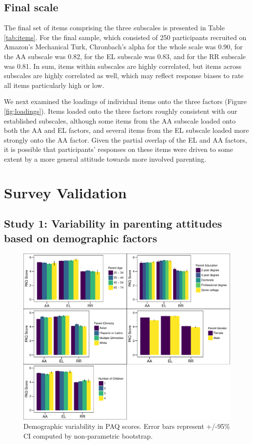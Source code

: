\documentclass[floatsintext,man]{apa6}
\theoremstyle{definition}
\theoremstyle{definition}
\theoremstyle{definition}
\theoremstyle{remark}
\begin{document}
\subsection{Final scale}\label{final-scale}

The final set of items comprising the three subscales is presented in
Table \ref{tab:items}. For the final sample, which consisted of 250
participants recruited on Amazon's Mechanical Turk, Chronbach's alpha
for the whole scale was 0.90, for the AA subscale was 0.82, for the EL
subscale was 0.83, and for the RR subscale was 0.81. In sum, items
within subscales are highly correlated, but items across subscales are
highly correlated as well, which may reflect response biases to rate all
items particularly high or low.

We next examined the loadings of individual items onto the three factors
(Figure \ref{fig:loadings}). Items loaded onto the three factors roughly
consistent with our established subscales, although some items from the
AA subscale loaded onto both the AA and EL factors, and several items
from the EL subscale loaded more strongly onto the AA factor. Given the
partial overlap of the EL and AA factors, it is possible that
participants' responses on these items were driven to some extent by a
more general attitude towards more involved parenting.

\section{Survey Validation}\label{survey-validation}

\subsection{Study 1: Variability in parenting attitudes based on
demographic
factors}\label{study-1-variability-in-parenting-attitudes-based-on-demographic-factors}

\begin{figure}
\centering
\includegraphics{PAQ_paper_files/figure-latex/demographics-1.pdf}
\caption{\label{fig:demographics}Demographic variability in PAQ scores.
Error bars represent +/-95\% CI computed by non-parametric bootstrap.}
\end{figure}
\end{document}
